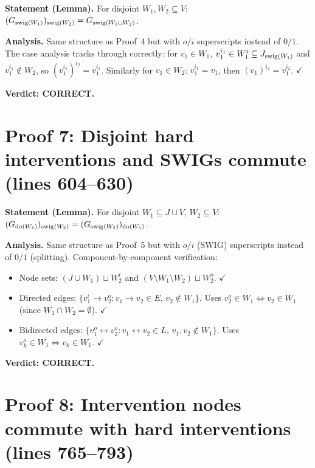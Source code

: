 \documentclass{article}
\begin{document}
\textbf{Statement (Lemma).}
For disjoint $W_1,W_2\subseteq V$:
$(G_{\mathrm{swig}(W_1)})_{\mathrm{swig}(W_2)} = G_{\mathrm{swig}(W_1\sqcup W_2)}$.

\textbf{Analysis.}
Same structure as Proof~4 but with $o/i$ superscripts instead of $0/1$.
The case analysis tracks through correctly: for $v_1\in W_1$,
$v_1^{i_1}\in W_1^i\subseteq J_{\mathrm{swig}(W_1)}$ and $v_1^{i_1}\notin W_2$,
so $(v_1^{i_1})^{i_2}=v_1^{i_1}$.
Similarly for $v_1\in W_2$: $v_1^{i_1}=v_1$, then $(v_1)^{i_2}=v_1^{i_2}$.
$\checkmark$

\textbf{Verdict: CORRECT.}

\section{Proof 7: Disjoint hard interventions and SWIGs commute (lines 604--630)}

\textbf{Statement (Lemma).}
For disjoint $W_1\subseteq J\cup V$, $W_2\subseteq V$:
$(G_{\operatorname{do}(W_1)})_{\mathrm{swig}(W_2)} = (G_{\mathrm{swig}(W_2)})_{\operatorname{do}(W_1)}$.

\textbf{Analysis.}
Same structure as Proof~5 but with $o/i$ (SWIG) superscripts instead of $0/1$ (splitting).
Component-by-component verification:
\begin{itemize}
  \item Node sets: $(J\cup W_1)\sqcup W_2^i$ and $(V\setminus W_1\setminus W_2)\sqcup W_2^o$.  $\checkmark$
  \item Directed edges: $\{v_1^i\to v_2^o : v_1\to v_2\in E,\, v_2\notin W_1\}$.
    Uses $v_2^o\in W_1\iff v_2\in W_1$ (since $W_1\cap W_2=\emptyset$).  $\checkmark$
  \item Bidirected edges: $\{v_1^o\leftrightarrow v_2^o : v_1\leftrightarrow v_2\in L,\, v_1,v_2\notin W_1\}$.
    Uses $v_k^o\in W_1\iff v_k\in W_1$.  $\checkmark$
\end{itemize}

\textbf{Verdict: CORRECT.}

\section{Proof 8: Intervention nodes commute with hard interventions (lines 765--793)}
\end{document}
